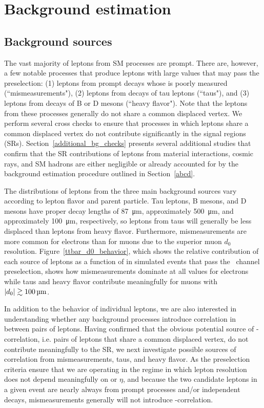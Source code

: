 \section{Background estimation}
\label{bg}

\subsection{Background sources}
\label{bg_sources}
The vast majority of leptons from SM processes are prompt. There are, however, a few notable processes that produce leptons with large \ad values that may pass the preselection: (1) leptons from prompt decays whose \ad is poorly measured (``mismeasurements"), (2) leptons from  decays of tau leptons (``taus"), and (3) leptons from decays of B or D mesons (``heavy flavor"). Note that the leptons from these processes generally do not share a common displaced vertex. We perform several cross checks to ensure that processes in which leptons share a common displaced vertex do not contribute significantly in the signal regions (SRs). Section~\ref{additional_bg_checks} presents several additional studies that confirm that the SR contributions of leptons from material interactions, cosmic rays, and SM hadrons are either negligible or already accounted for by the background estimation procedure outlined in Section~\ref{abcd}.

The \ad distributions of leptons from the three main background sources vary according to lepton flavor and parent particle. Tau leptons, B mesons, and D mesons have proper decay lengths of \SI{87}{\um}, approximately \SI{500}{\um}, and approximately \linebreak[4]\SI{100}{\um}, respectively, so leptons from taus will generally be less displaced than leptons from heavy flavor. Furthermore, mismeasurements are more common for electrons than for muons due to the superior muon $d_0$ resolution. Figure~\ref{ttbar_d0_behavior}, which shows the relative contribution of each source of leptons as a function of \ad in simulated \ttbar events that pass the \Pe\Pgm\ channel preselection, shows how mismeasurements dominate at all \ad values for electrons while taus and heavy flavor contribute meaningfully for muons with $\ad\gtrsim\SI{100}{\um}$.



In addition to the \ad behavior of individual leptons, we are also interested in understanding whether any background processes introduce correlation in \ad between pairs of leptons. Having confirmed that the obvious potential source of \ad-\ad correlation, i.e. pairs of leptons that share a common displaced vertex, do not contribute meaningfully to the SR, we next investigate possible sources of correlation from mismeasurements, taus, and heavy flavor. As the preselection criteria ensure that we are operating in the regime in which lepton \ad resolution does not depend meaningfully on \pt or $\eta$, and because the two candidate leptons in a given event are nearly always from prompt processes and/or independent decays, mismeasurements generally will not introduce \ad-\ad correlation.

